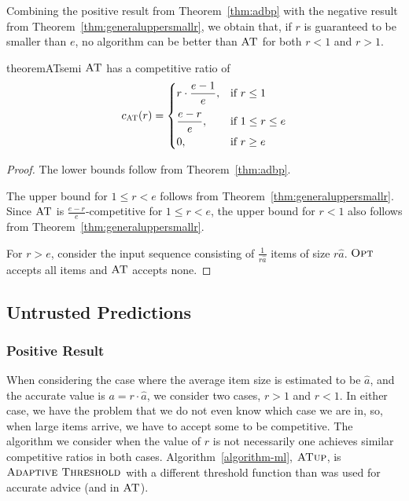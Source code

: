 \documentclass[a4paper,UKenglish,cleveref, autoref, thm-restate]{lipics-v2021}
\newcommand{\bALG}{\ensuremath{\operatorname{\textsc{Adaptive Threshold}}}\xspace}
\newcommand{\OPT}{\ensuremath{\operatorname{\textsc{Opt}}}\xspace}
\newcommand{\ADB}{\ensuremath{\operatorname{\textsc{AT}}}\xspace}
\newcommand{\ADBML}{\ensuremath{\operatorname{\textsc{AT}}}\xspace}
\newcommand{\MLB}{\ensuremath{\operatorname{\textsc{ATup}}}\xspace}
\newcommand{\guess}{\ensuremath{\hat{a}}\xspace}
\begin{document}
Combining 
the positive result from
Theorem~\ref{thm:adbp} with the negative result from
Theorem~\ref{thm:generaluppersmallr}, we obtain that, if $r$ is
guaranteed to be smaller than $e$, no algorithm can be better than
\ADB for both $r < 1$ and $r > 1$.

\begin{restatable}{theorem}{ATsemi}
  \label{thm:ATsemi}
  \ADBML has a competitive ratio of
  $$c_{\ADBML}(r) =
    \begin{cases}
      \displaystyle r \cdot \frac{e-1}{e}, & \text{if } r \leq 1\\[2ex]
      \displaystyle \frac{e-r}{e},         & \text{if } 1 \leq r \leq e \\[1ex]
      \displaystyle 0,                     & \text{if } r \geq e
    \end{cases}
  $$
\end{restatable}
\begin{proof}
  The lower bounds follow from Theorem~\ref{thm:adbp}.

  The upper bound for $1 \leq r < e$ follows from
  Theorem~\ref{thm:generaluppersmallr}.
  Since \ADBML is $\frac{e-r}{e}$-competitive for $1 \leq r < e$, the
  upper bound for $r < 1$ also follows from
  Theorem~\ref{thm:generaluppersmallr}.

  For $r > e$, consider the input sequence consisting of
  $\frac{1}{r\guess}$ items of size $r\guess$.
  \OPT accepts all items and \ADBML accepts none.
\end{proof}

\subsection{Untrusted Predictions}
\label{sec:MLalg}

\subsubsection{Positive Result}
\label{positiveML}
When considering the case where the average item size is estimated to
be $\guess$, and the accurate value is $a=r\cdot \guess$, we
consider two cases, $r>1$ and $r<1$. In either case, we have the
problem that we do not even know which case we are in, so, when large
items arrive, we have to accept some to be competitive. The algorithm
we consider when the value of $r$ is not necessarily one achieves
similar competitive ratios in both cases.
Algorithm~\ref{algorithm-ml}, \MLB, is \bALG with a different threshold
function than was used for accurate advice (and in \ADBML).
\end{document}
